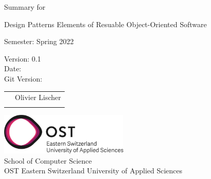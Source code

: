 \begin{titlepage}

  \begin{center}

    {\Huge Summary for}
    \vspace{1 cm}

    {\LARGE Design Patterns Elements of Resuable Object-Oriented Software}

    \vspace{9 cm}

    Semester: Spring 2022

    \vspace{1 cm}

    Version: 0.1 \\
    Date: \DTMnow \\
    Git Version: \gitDescription
    \vspace{1 cm}

    \begin{tabular}{rl}
      & Olivier Lischer \\
      &                    \\
    \end{tabular}

    \vfill

    \includegraphics[height=2cm]{resources/ost-logo.png}\\

    \vspace{1cm}
    School of Computer Science\\
    OST Eastern Switzerland University of Applied Sciences

  \end{center}

\end{titlepage}
